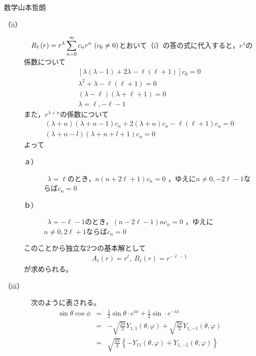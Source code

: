 \documentclass[fleqn]{jbook}
\begin{document}
\begin{answer}{数学}{山本哲朗}
\begin{description}
        \item[{\rm （ii）}] 　$\displaystyle R_\ell\left( r \right)=r^\lambda\sum^\infty_{n=0}c_nr^n~(c_0\neq 0)$とおいて（i）の答の式に代入すると，$r^\lambda$の係数について
\begin{eqnarray}
\left[\lambda\left(\lambda-1\right)+2\lambda-\ell\left(\ell+1\right)\right]c_0=0 \nonumber \\
\lambda^2+\lambda-\ell\left(\ell+1\right)=0 \nonumber \\
\left(\lambda-\ell\right)\left(\lambda+\ell+1\right)=0 \nonumber \\
\lambda=\ell,-\ell-1 \nonumber
\end{eqnarray}
また，$r^{\lambda+n}$の係数について
\begin{eqnarray}
\left(\lambda+n\right)\left(\lambda+n-1\right)c_n+2\left(\lambda+n\right)c_n-\ell\left(\ell+1\right)c_n=0 \nonumber \\
\left(\lambda+n-l\right)\left(\lambda+n+l+1\right)c_n=0 \nonumber
\end{eqnarray}
よって
\begin{description}
    \item[{\rm ａ）}] ~$\lambda=\ell$のとき，$n\left(n+2\ell+1\right)c_n=0$ ，ゆえに$n\neq 0,-2\ell-1$ならば$c_n=0$ 
    \item[{\rm ｂ）}] ~$\lambda=-\ell-1$のとき，$\left(n-2\ell-1\right)nc_n=0$ ，ゆえに$n\neq 0,2\ell+1$ならば$c_n=0$ 
\end{description}
このことから独立な2つの基本解として
\begin{eqnarray}
A_\ell\left(r\right)=r^\ell,~B_\ell\left(r\right)=r^{-\ell-1} \nonumber
\end{eqnarray}
が求められる。\\
        
        \item[{\rm （iii）}] 　次のように表される。
\begin{eqnarray}
\sin\theta\cos\phi &=& \frac{1}{2}\sin\theta\cdot e^{i\phi}+\frac{1}{2}\sin\cdot e^{-i\phi} \nonumber \\
&=& -\sqrt{\frac{2\pi}{3}}Y_{1,1}\left( \theta,\varphi \right)+\sqrt{\frac{2\pi}{3}}Y_{1,-1}\left( \theta,\varphi \right) \nonumber \\
&=& \sqrt{\frac{2\pi}{3}}\left\{-Y_{11}\left( \theta,\varphi \right)+Y_{1,-1}\left( \theta,\varphi \right)\right\} \nonumber
\end{eqnarray}
        

\end{description}
\end{answer}
\end{document}
